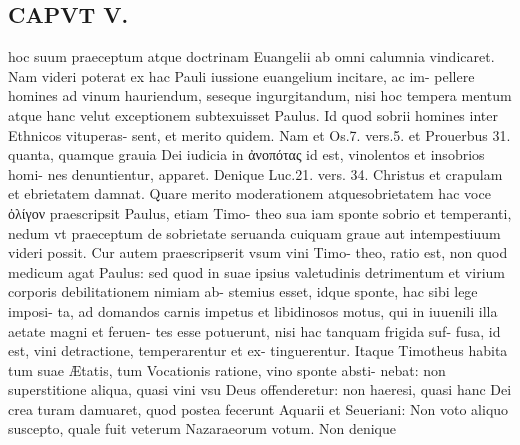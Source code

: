 \documentclass{article}
\begin{document}
\begin{pages}
\section*{CAPVT V. }
\marginpar{[ p.369 ]}\pstart hoc suum praeceptum atque doctrinam Euangelii ab omni calumnia vindicaret. Nam videri poterat ex hac Pauli iussione euangelium incitare, ac im- pellere homines ad vinum hauriendum, seseque ingurgitandum, nisi hoc tempera mentum atque hanc velut exceptionem subtexuisset Paulus. Id quod sobrii homines inter Ethnicos vituperas- sent, et merito quidem. Nam et Os.7. vers.5. et Prouerbus 31. quanta, quamque grauia Dei iudicia in ἀνοπότας id est, vinolentos et insobrios homi- nes denuntientur, apparet. Denique Luc.21. vers. 34. Christus et crapulam et ebrietatem damnat. Quare merito moderationem atquesobrietatem hac voce ὀλίγον praescripsit Paulus, etiam Timo- theo sua iam sponte sobrio et temperanti, nedum vt praeceptum de sobrietate seruanda cuiquam graue aut intempestiuum videri possit. Cur autem praescripserit vsum vini Timo- theo, ratio est, non quod medicum agat Paulus: sed quod in suae ipsius valetudinis detrimentum et virium corporis debilitationem nimiam ab- stemius esset, idque sponte, hac sibi lege imposi- ta, ad domandos carnis impetus et libidinosos motus, qui in iuuenili illa aetate magni et feruen- tes esse potuerunt, nisi hac tanquam frigida suf- fusa, id est, vini detractione, temperarentur et ex- tinguerentur. Itaque Timotheus habita tum suae Ætatis, tum Vocationis ratione, vino sponte absti- nebat: non superstitione aliqua, quasi vini vsu Deus offenderetur: non haeresi, quasi hanc Dei crea turam damuaret, quod postea fecerunt Aquarii et Seueriani: Non voto aliquo suscepto, quale fuit veterum Nazaraeorum votum. Non denique  \pend

\end{pages}
\end{document}
